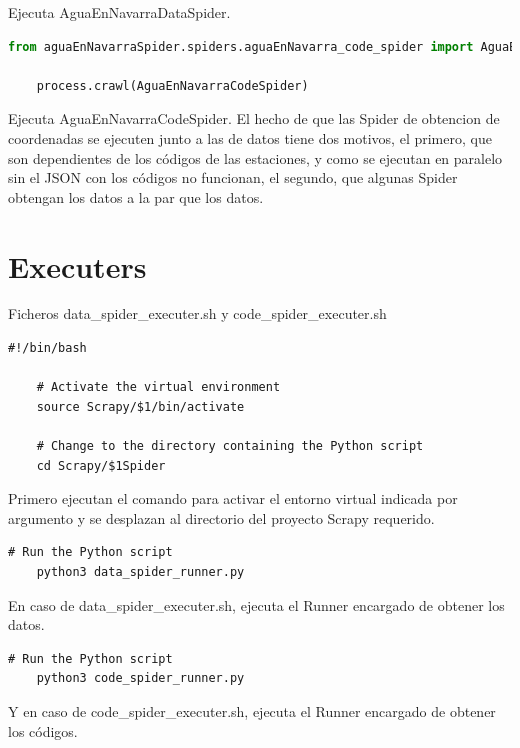 Ejecuta AguaEnNavarraDataSpider.

\begin{lstlisting}[language=Python, caption={Agua en Navarra Code Runner}]
	from aguaEnNavarraSpider.spiders.aguaEnNavarra_code_spider import AguaEnNavarraCodeSpider

	process.crawl(AguaEnNavarraCodeSpider)
\end{lstlisting}

Ejecuta AguaEnNavarraCodeSpider.\newline
\newline
El hecho de que las Spider de obtencion de coordenadas se ejecuten junto a las de datos tiene dos motivos, el primero, que son dependientes de los códigos de las estaciones, y como se ejecutan en paralelo sin el JSON con los códigos no funcionan, el segundo, que algunas Spider obtengan los datos a la par que los datos.

\section{Executers}
Ficheros data\_spider\_executer.sh y code\_spider\_executer.sh

\begin{lstlisting}[caption={Ejecucion de entorno virtual y selección de proyecto Scrapy}]
	#!/bin/bash
	
	# Activate the virtual environment
	source Scrapy/$1/bin/activate
	
	# Change to the directory containing the Python script
	cd Scrapy/$1Spider
\end{lstlisting}

Primero ejecutan el comando para activar el entorno virtual indicada por argumento y se desplazan al directorio del proyecto Scrapy requerido.

\begin{lstlisting}[caption={Ejecución de data\_spider\_runner.py}]
	# Run the Python script
	python3 data_spider_runner.py
\end{lstlisting}

En caso de data\_spider\_executer.sh, ejecuta el Runner encargado de obtener los datos.

\begin{lstlisting}[caption={Ejecución de code\_spider\_runner.py}]
	# Run the Python script
	python3 code_spider_runner.py
\end{lstlisting}

Y en caso de code\_spider\_executer.sh, ejecuta el Runner encargado de obtener los códigos.

